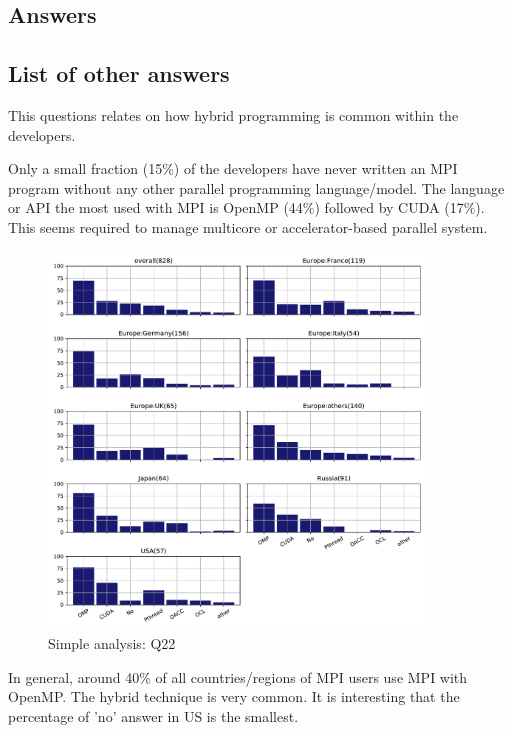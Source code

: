 
\subsection{Answers}



\subsection{List of other answers}
\begin{itemize}

\end{itemize}
This questions relates on how hybrid programming is common within the
developers. 

Only a small fraction (15\%) of the developers have never written an MPI  program
without any other parallel programming language/model. The language
or API the most used with MPI is OpenMP (44\%) followed by CUDA
(17\%). This seems required to manage multicore or accelerator-based parallel
system. 

\begin{figure}[htb]
\begin{center}
\includegraphics[width=10cm]{../pdfs/Q22.pdf}
\caption{Simple analysis: Q22}
\label{fig:Q22}
\end{center}
\end{figure}

In general, around 40\% of all countries/regions of MPI users
use MPI with OpenMP. The hybrid technique is very common.
It is interesting that the percentage of 'no' answer in US is the
smallest. 
